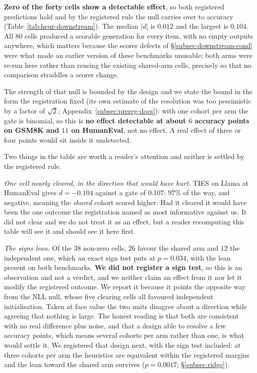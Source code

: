 \textbf{Zero of the forty cells show a detectable effect}, so both registered
predictions hold and by the registered rule the null carries over to accuracy
(Table~\ref{tab:heur-downstream}). The median $|d|$ is $0.012$ and the largest
is $0.104$. All $80$ cells produced a scorable generation for every item, with
no empty outputs anywhere, which matters because the scorer defects of
\S\ref{subsec:downstream-cond} were what made an earlier version of these
benchmarks unusable; both arms were re-run here rather than reusing the
existing shared-arm cells, precisely so that no comparison straddles a scorer
change.

The strength of that null is bounded by the design and we state the bound in
the form the registration fixed (its own estimate of the resolution was too
pessimistic by a factor of $\sqrt 2$; Appendix~\ref{subsec:prereg-docs}):
with one cohort per arm the gate is binomial, so this is
\textbf{no effect detectable at about $6$ accuracy points on GSM8K and $11$ on
HumanEval}, not no effect. A real effect of three or four points would sit
inside it undetected.

Two things in the table are worth a reader's attention and neither is settled
by the registered rule.

\emph{One cell nearly cleared, in the direction that would have hurt.} TIES on
Llama at HumanEval gives $d = -0.104$ against a gate of $0.107$: $97\%$ of the
way, and negative, meaning the \emph{shared} cohort scored higher. Had it
cleared it would have been the one outcome the registration named as most
informative against us. It did not clear and we do not treat it as an effect,
but a reader recomputing this table will see it and should see it here first.

\emph{The signs lean.} Of the $38$ non-zero cells, $26$ favour the shared arm
and $12$ the independent one, which an exact sign test puts at $p = 0.034$,
with the lean present on both benchmarks. \textbf{We did not register a sign
test}, so this is an observation and not a verdict, and we neither claim an
effect from it nor let it modify the registered outcome. We report it because
it points the opposite way from the NLL null, whose five clearing cells all
favoured independent initialisation. Taken at face value the two units
disagree about a direction while agreeing that nothing is large. The honest
reading is that both are consistent with no real difference plus noise, and
that a design able to resolve a few accuracy points, which means several
cohorts per arm rather than one, is what would settle it. We registered that
design next, with the sign test included: at three cohorts per arm the
heuristics are equivalent within the registered margins and the lean toward
the shared arm survives ($p = 0.0017$; \S\ref{subsec:ridge}).

